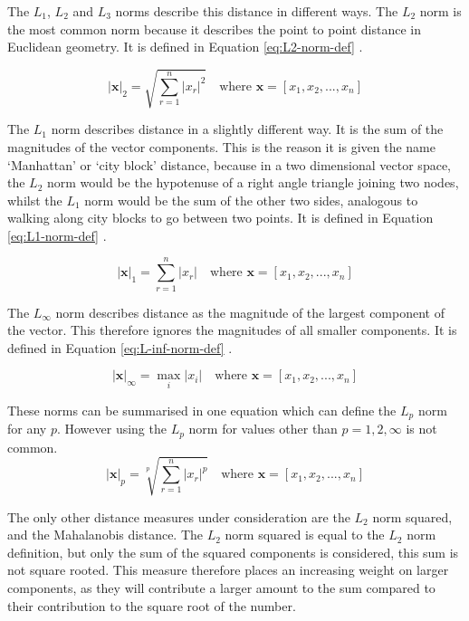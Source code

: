 \begin{appendices}
The $L_1$, $L_2$ and $L_3$ norms describe this distance in different ways. The $L_2$ norm is the most common norm because it describes the point to point distance in Euclidean geometry. It is defined in Equation \ref{eq:L2-norm-def} \cite[p.1081]{gradshteyn2007}.

\begin{equation}
|\mathbf{x}|_2 = \sqrt{\sum_{r=1}^{n} |x_r|^2} \quad \text{where } \mathbf{x} = [ x_1 , x_2, ... , x_n] \label{eq:L2-norm-def}
\end{equation}

The $L_1$ norm describes distance in a slightly different way. It is the sum of the magnitudes of the vector components. This is the reason it is given the name `Manhattan' or `city block' distance, because in a two dimensional vector space, the $L_2$ norm would be the hypotenuse of a right angle triangle joining two nodes, whilst the $L_1$ norm would be the sum of the other two sides, analogous to walking along city blocks to go between two points. It is defined in Equation \ref{eq:L1-norm-def} \cite[p.1081]{gradshteyn2007}.

\begin{equation}
|\mathbf{x}|_1 = \sum_{r=1}^{n} |x_r| \quad \text{where } \mathbf{x} = [ x_1 , x_2, ... , x_n] \label{eq:L1-norm-def}
\end{equation}

The $L_\infty $ norm describes distance as the magnitude of the largest component of the vector. This therefore ignores the magnitudes of all smaller components. It is defined in Equation \ref{eq:L-inf-norm-def} \cite[p.1081]{gradshteyn2007}.

\begin{equation}
|\mathbf{x}|_\infty = \max_{i} |x_i| \quad \text{where } \mathbf{x} = [ x_1 , x_2, ... , x_n] \label{eq:L-inf-norm-def}
\end{equation}

These norms can be summarised in one equation which can define the $L_p$ norm for any $p$. However using the $L_p$ norm for values other than $p=1,2,\infty$ is not common.
\begin{equation}
|\mathbf{x}|_p = \sqrt[p]{\sum_{r=1}^{n} |x_r|^p} \quad \text{where } \mathbf{x} = [ x_1 , x_2, ... , x_n] \label{eq:Lp-norm-def}
\end{equation}

The only other distance measures under consideration are the $L_2$ norm squared, and the Mahalanobis distance. The $L_2$ norm squared is equal to the $L_2$ norm definition, but only the sum of the squared components is considered, this sum is not square rooted. This measure therefore places an increasing weight on larger components, as they will contribute a larger amount to the sum compared to their contribution to the square root of the number.


\end{appendices}
